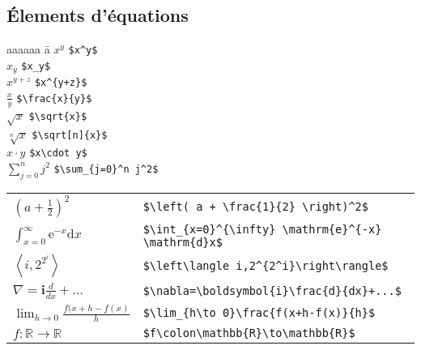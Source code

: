 \documentclass{article}
\newenvironment{tighttabbing}
  {\begingroup\setlength{\parskip}{0pt}\begin{tabbing}}
  {\end{tabbing}\endgroup}
\let\code\lstinline
\begin{document}
\begin{multicols*}{3}
\subsection*{Élements d'équations}

\begin{multicols*}{2}
\begin{tighttabbing}
    aaaaaa \= a \kill
    $x^y$                                             \> \code+$x^y$+                                             \\
    $x_y$                                             \> \code+$x_y$+                                             \\
    $x^{y+z}$                                         \> \code!$x^{y+z}$!                                         \\
    $\frac{x}{y}$                                     \> \code!$\frac{x}{y}$!                                     \\
    $\sqrt{x}$                                        \> \code+$\sqrt{x}$+                                        \\
    $\sqrt[n]{x}$                                     \> \code+$\sqrt[n]{x}$+                                     \\
    $x\cdot y$                                        \> \code+$x\cdot y$+                                        \\
    $\sum_{j=0}^n j^2$                                \> \code+$\sum_{j=0}^n j^2$+
\end{tighttabbing}
\end{multicols*}

\begin{tabular}{p{2cm}l}

    $\left(a + \frac{1}{2} \right)^2$                 & \code!$\left( a + \frac{1}{2} \right)^2$!                \\
    $\int_{x=0}^{\infty} \mathrm{e}^{-x} \mathrm{d}x$ & \code+$\int_{x=0}^{\infty} \mathrm{e}^{-x} \mathrm{d}x$+ \\
    $\left\langle i,2^{2^i}\right\rangle$             & \code+$\left\langle i,2^{2^i}\right\rangle$+             \\
    $\nabla=\boldsymbol{i}\frac{d}{dx}+...$           & \code!$\nabla=\boldsymbol{i}\frac{d}{dx}+...$!           \\
    $\lim_{h\to 0}\frac{f(x+h-f(x)}{h}$               & \code!$\lim_{h\to 0}\frac{f(x+h-f(x)}{h}$!               \\
    $f\colon\mathbb{R}\to\mathbb{R}$                  & \code+$f\colon\mathbb{R}\to\mathbb{R}$+                  \\
\end{tabular}


\end{multicols*}
\end{document}
